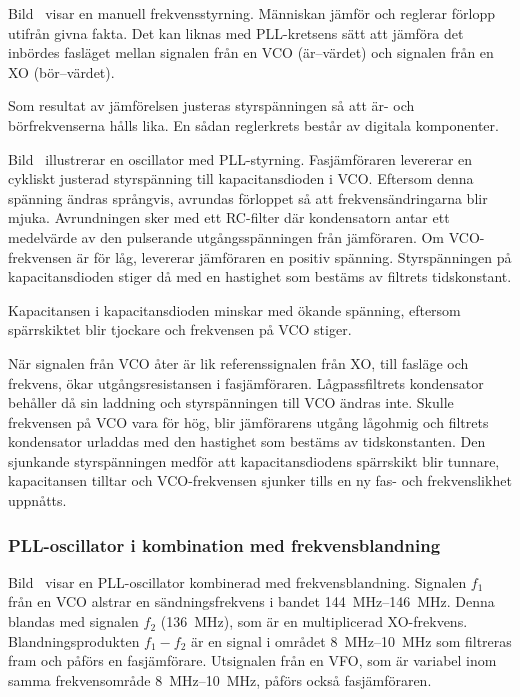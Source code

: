 Bild~ visar en manuell frekvensstyrning.
Människan jämför och reglerar förlopp utifrån givna fakta.
Det kan liknas med PLL-kretsens sätt att jämföra det inbördes fasläget mellan
signalen från en VCO (är--värdet) och signalen från en XO (bör--värdet).

Som resultat av jämförelsen justeras styrspänningen så att är- och
börfrekvenserna hålls lika.
En sådan reglerkrets består av digitala komponenter.


Bild~ illustrerar en oscillator med PLL-styr\-ning.
Fasjämföraren levererar en cykliskt justerad styrspänning till
kapacitansdioden i VCO.
Eftersom denna spänning ändras språngvis, avrundas förloppet så att
frekvensändringarna blir mjuka.
Avrundningen sker med ett RC-filter där kondensatorn antar ett medelvärde av
den pulserande utgångsspänningen från jämföraren.
Om VCO-frekvensen är för låg, levererar jämföraren en positiv spänning.
Styrspänningen på kapacitansdioden stiger då med en hastighet som bestäms av
filtrets tidskonstant.

Kapacitansen i kapacitansdioden minskar med ökande spänning, eftersom
spärrskiktet blir tjockare och frekvensen på VCO stiger.

När signalen från VCO åter är lik referenssignalen från XO, till
fasläge och frekvens, ökar utgångsresistansen i fasjämföraren.
Lågpassfiltrets kondensator behåller då sin laddning och styrspänningen till
VCO ändras inte.
Skulle frekvensen på VCO vara för hög, blir jämförarens utgång lågohmig och
filtrets kondensator urladdas med den hastighet som bestäms av tidskonstanten.
Den sjunkande styrspänningen medför att kapacitansdiodens spärrskikt blir
tunnare, kapacitansen tilltar och VCO-frekvensen sjunker tills en ny fas- och
frekvenslikhet uppnåtts.

\subsubsection{PLL-oscillator i kombination med frekvensblandning}


Bild~ visar en PLL-oscillator kombinerad med
frekvensblandning.
Signalen \(f_1\) från en VCO alstrar en sändningsfrekvens i bandet
\SIrange{144}{146}{\mega\hertz}.
Denna blandas med signalen \(f_2\) (\qty{136}{\mega\hertz}), som är en
multiplicerad XO-frekvens.
Blandningsprodukten \(f_1 - f_2\) är en signal i området
\SIrange{8}{10}{\mega\hertz} som filtreras fram och påförs en fasjämförare.
Utsignalen från en VFO, som är variabel inom samma frekvensområde
\SIrange{8}{10}{\mega\hertz}, påförs också fasjämföraren.

